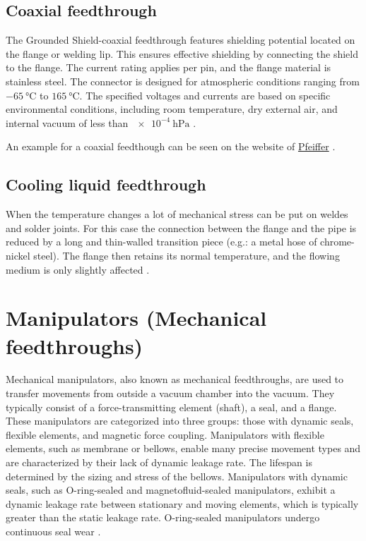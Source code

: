 \subsection{Coaxial feedthrough}


The Grounded Shield-coaxial feedthrough features shielding potential located on the flange or welding lip.
This ensures effective shielding by connecting the shield to the flange.
The current rating applies per pin, and the flange material is stainless steel.
The connector is designed for atmospheric conditions ranging from $\SI{-65}{\degreeCelsius}$ to $\SI{165}{\degreeCelsius}$.
The specified voltages and currents are based on specific environmental conditions, including room temperature, dry external air, and internal vacuum of less than $\SI{e-4}{\hecto\pascal}$ \cite{pfeiffer_coaxial}.

An example for a coaxial feedthough can be seen on the website of \href{https://www.pfeiffer-vacuum.com/global/de/shop/products/420XBG040_4}{Pfeiffer} \cite{pfeiffer_coaxial}.


\subsection{Cooling liquid feedthrough}
When the temperature changes a lot of mechanical stress can be put on weldes and solder joints. For this case the connection between the flange and the pipe is reduced by a long and thin-walled transition piece (e.g.: a metal hose of chrome-nickel steel).
The flange then retains its normal temperature, and the flowing medium is only slightly affected \cite{Wutz2000}.

\section{Manipulators (Mechanical feedthroughs)}


Mechanical manipulators, also known as mechanical feedthroughs, are used to transfer movements from outside a vacuum chamber into the vacuum.
They typically consist of a force-transmitting element (shaft), a seal, and a flange. These manipulators are categorized into three groups: those with dynamic seals, flexible elements, and magnetic force coupling.
Manipulators with flexible elements, such as membrane or bellows, enable many precise movement types and are characterized by their lack of dynamic leakage rate. The lifespan is determined by the sizing and stress of the bellows.
Manipulators with dynamic seals, such as O-ring-sealed and magnetofluid-sealed manipulators, exhibit a dynamic leakage rate between stationary and moving elements, which is typically greater than the static leakage rate. O-ring-sealed manipulators undergo continuous seal wear \cite{jousten_handbuch_2018}.




